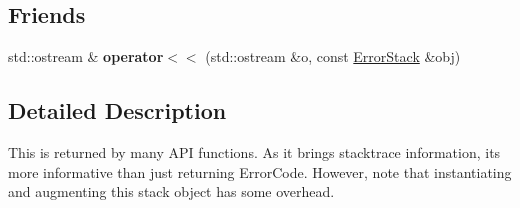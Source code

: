 \subsection*{Friends}
\begin{DoxyCompactItemize}
\item 
std\+::ostream \& {\bfseries operator$<$$<$} (std\+::ostream \&o, const \hyperlink{classalps_1_1ErrorStack}{Error\+Stack} \&obj)\hypertarget{classalps_1_1ErrorStack_adfc96f96e5d8f4c12b4a9cea60c1fbb4}{}\label{classalps_1_1ErrorStack_adfc96f96e5d8f4c12b4a9cea60c1fbb4}

\end{DoxyCompactItemize}


\subsection{Detailed Description}
This is returned by many A\+PI functions. As it brings stacktrace information, it\textquotesingle{}s more informative than just returning Error\+Code. However, note that instantiating and augmenting this stack object has some overhead.

